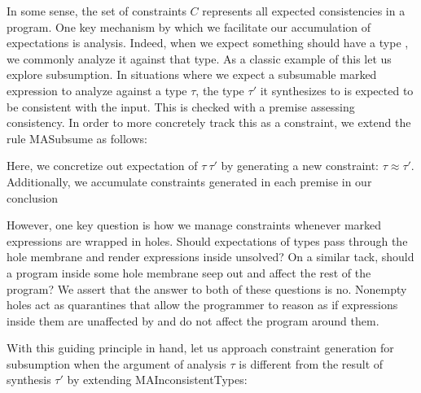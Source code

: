 In some sense, the set of constraints $C$ represents all expected consistencies in a program. One key mechanism by which we facilitate our accumulation of expectations is analysis. Indeed, when we expect something should have a type \TMV, we commonly analyze it against that type. As a classic example of this let us explore subsumption. In situations where we expect a subsumable marked expression to analyze against a type $\tau$, the type $\tau'$ it synthesizes to is expected to be consistent with the input. This is checked with a premise assessing consistency. In order to more concretely track this as a constraint, we extend the rule MASubsume  as follows:

\begin{mathpar}
\end{mathpar}

Here, we concretize out expectation of $\tau ~ \tau'$ by generating a new constraint: $\tau \approx \tau'$. Additionally, we accumulate constraints generated in each premise in our conclusion

However, one key question is how we manage constraints whenever marked expressions are wrapped in holes. Should expectations of types pass through the hole membrane and render expressions inside unsolved? On a similar tack, should a program inside some hole membrane seep out and affect the rest of the program? We assert that the answer to both of these questions is no. Nonempty holes act as quarantines that allow the programmer to reason as if expressions inside them are unaffected by and do not affect the program around them.

With this guiding principle in hand, let us approach constraint generation for subsumption when the argument of analysis $\tau$ is different from the result of synthesis $\tau'$ by extending MAInconsistentTypes:

\begin{mathpar}
\end{mathpar}

